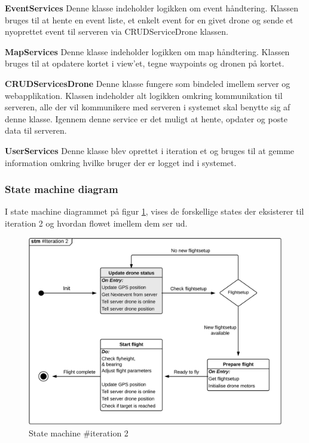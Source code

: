 \textbf{EventServices}
Denne klasse indeholder logikken om event håndtering. Klassen bruges til at hente en event liste, et enkelt event for en givet drone og sende et nyoprettet event til serveren via CRUDServiceDrone klassen.

\textbf{MapServices}
Denne klasse indeholder logikken om map håndtering. Klassen bruges til at opdatere kortet i view'et, tegne waypoints og dronen på kortet.


\newpage

\textbf{CRUDServicesDrone}
Denne klasse fungere som bindeled imellem server og webapplikation. Klassen indeholder alt logikken omkring kommunikation til serveren, alle der vil kommunikere med serveren i systemet skal benytte sig af denne klasse. Igennem denne service er det muligt at hente, opdater og poste data til serveren.

\textbf{UserServices}
Denne klasse blev oprettet i iteration et og bruges til at gemme information omkring hvilke bruger der er logget ind i systemet.

\vspace{1cm}

\subsubsection*{State machine diagram}
\vspace{-0.1cm}
I state machine diagrammet på figur \ref{fig:Statemachine_iteration2}, vises de forskellige states der eksisterer til iteration 2 og hvordan flowet imellem dem ser ud. 
\begin{figure}[H]
	\centering
	\includegraphics[width=1\textwidth]{Billeder/statemachine/State_iteration2.png}
	\vspace{-0.5cm}
	\caption{State machine \#iteration 2}
	\label{fig:Statemachine_iteration2}
\end{figure}